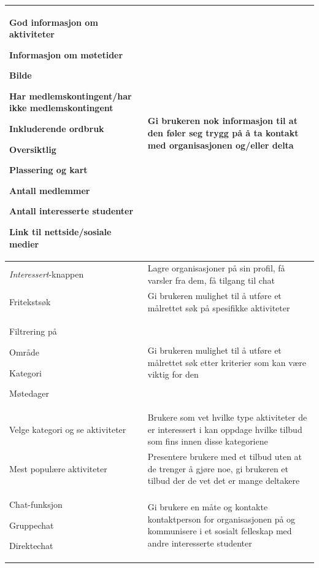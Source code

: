 \begin{center}
\begin{longtabu}{|X|X|}
God informasjon om aktiviteter 
\begin{compactitem}
    \item Informasjon om møtetider
    \item Bilde
    \item Har medlemskontingent/har ikke medlemskontingent
    \item Inkluderende ordbruk
    \item Oversiktlig
    \item Plassering og kart
    \item Antall medlemmer
    \item Antall interesserte studenter
    \item Link til nettside/sosiale medier
\end{compactitem}
&  Gi brukeren nok informasjon til at den føler seg trygg på å ta kontakt med organisasjonen og/eller delta\\ \hline

{\em Interessert}-knappen
& Lagre organisasjoner på sin profil, få varsler fra dem, få tilgang til chat \\ \hline


Fritekstsøk
& Gi brukeren mulighet til å utføre et målrettet søk på spesifikke aktiviteter \\ \hline

Filtrering på
\begin{compactitem}
    \item Område
    \item Kategori
    \item Møtedager
\end{compactitem}
& Gi brukeren mulighet til å utføre et målrettet søk etter kriterier som kan være viktig for den \\ \hline

Velge kategori og se aktiviteter
& Brukere som vet hvilke type aktiviteter de er interessert i kan oppdage hvilke tilbud som fins innen disse kategoriene \\ \hline

Mest populære aktiviteter  
& Presentere brukere med et tilbud uten at de trenger å gjøre noe, gi brukeren et tilbud der de vet det er mange deltakere \\ \hline

Chat-funksjon  
\begin{compactitem}
    \item Gruppechat
    \item Direktechat
\end{compactitem}
& Gi brukere en måte og kontakte kontaktperson for organisasjonen på og kommunisere i et sosialt felleskap med andre interesserte studenter \\ \hline


\end{longtabu}
\end{center}
